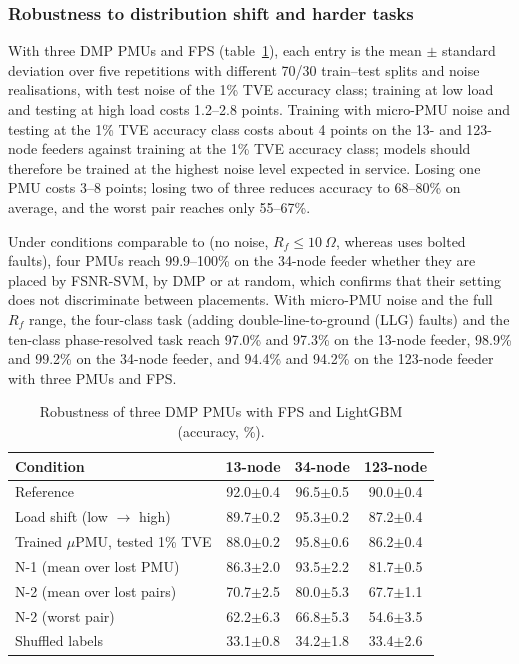 \documentclass[11pt]{article}
\newenvironment{nw}{}{}
\newenvironment{nwf}{}{}
\begin{document}
\begin{nw}

\subsubsection{Robustness to distribution shift and harder tasks}\label{subsec5_8}

With three DMP PMUs and FPS (table~\ref{tab6}), each entry is the mean $\pm$ standard deviation over five repetitions with different 70/30 train--test splits and noise realisations, with test noise of the 1\% TVE accuracy class; training at low load and testing at high load costs 1.2--2.8 points. Training with micro-PMU noise and testing at the 1\% TVE accuracy class costs about 4 points on the 13- and 123-node feeders against training at the 1\% TVE accuracy class; models should therefore be trained at the highest noise level expected in service. Losing one PMU costs 3--8 points; losing two of three reduces accuracy to 68--80\% on average, and the worst pair reaches only 55--67\%.

Under conditions comparable to \cite{khattak2025} (no noise, $R_f\le10~\Omega$, whereas \cite{khattak2025} uses bolted faults), four PMUs reach 99.9--100\% on the 34-node feeder whether they are placed by FSNR-SVM, by DMP or at random, which confirms that their setting does not discriminate between placements. With micro-PMU noise and the full $R_f$ range, the four-class task (adding double-line-to-ground (LLG) faults) and the ten-class phase-resolved task reach 97.0\% and 97.3\% on the 13-node feeder, 98.9\% and 99.2\% on the 34-node feeder, and 94.4\% and 94.2\% on the 123-node feeder with three PMUs and FPS.

\end{nw}
\begin{table}[!htbp]
\centering
\begin{nwf}
\caption{Robustness of three DMP PMUs with FPS and LightGBM (accuracy, \%).}\label{tab6}
\small
\begin{tabular}{lccc}
\toprule
Condition & 13-node & 34-node & 123-node \\
\midrule
Reference                           & 92.0$\pm$0.4 & 96.5$\pm$0.5 & 90.0$\pm$0.4 \\
Load shift (low $\rightarrow$ high) & 89.7$\pm$0.2 & 95.3$\pm$0.2 & 87.2$\pm$0.4 \\
Trained $\mu$PMU, tested 1\% TVE    & 88.0$\pm$0.2 & 95.8$\pm$0.6 & 86.2$\pm$0.4 \\
N-1 (mean over lost PMU)            & 86.3$\pm$2.0 & 93.5$\pm$2.2 & 81.7$\pm$0.5 \\
N-2 (mean over lost pairs)          & 70.7$\pm$2.5 & 80.0$\pm$5.3 & 67.7$\pm$1.1 \\
N-2 (worst pair)                    & 62.2$\pm$6.3 & 66.8$\pm$5.3 & 54.6$\pm$3.5 \\
Shuffled labels                     & 33.1$\pm$0.8 & 34.2$\pm$1.8 & 33.4$\pm$2.6 \\
\bottomrule
\end{tabular}
\end{nwf}
\end{table}
\end{document}
